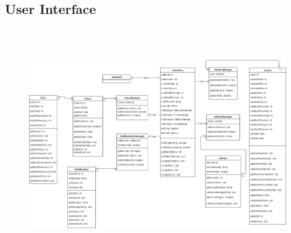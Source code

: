\subsection{User Interface}
\begin{center}
\begin{figure}[h]
	\includegraphics[width=15cm, height=10cm]{UserInterface/Interface.PNG}
\end{figure}
\end{center}


